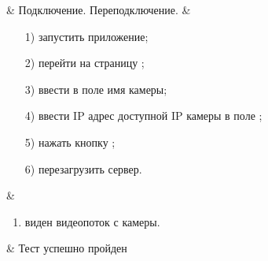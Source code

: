 \begin{longtable}
	 & Подключение. Переподключение. & 
   			\begin{enumerate}
				\item[1)] запустить приложение;
				\item[2)] перейти на страницу \addCameraPage{};
				\item[3)] ввести в поле \ipInput{} имя камеры;
				\item[4)] ввести IP адрес доступной IP камеры в поле \ipInput{};
				\item[5)] нажать кнопку \connectButton{};
				\item[6)] перезагрузить сервер.
			\end{enumerate}
   			& 
   			\begin{enumerate}
   				\item виден видеопоток с камеры.
   			\end{enumerate}
   			& Тест успешно пройден \\

   \hline
\end{longtable}

